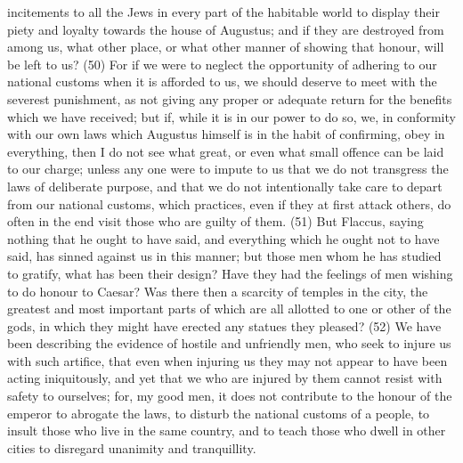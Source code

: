 incitements to all the Jews in every part of the habitable world to display their piety and loyalty
towards the house of Augustus; and if they are destroyed from among us, what other place, or
what other manner of showing that honour, will be left to us? (50) For if we were to neglect the
opportunity of adhering to our national customs when it is afforded to us, we should deserve to
meet with the severest punishment, as not giving any proper or adequate return for the benefits
which we have received; but if, while it is in our power to do so, we, in conformity with our own laws
which Augustus himself is in the habit of confirming, obey in everything, then I do not see what
great, or even what small offence can be laid to our charge; unless any one were to impute to us
that we do not transgress the laws of deliberate purpose, and that we do not intentionally take care
to depart from our national customs, which practices, even if they at first attack others, do often in
the end visit those who are guilty of them. (51) But Flaccus, saying nothing that he ought to have
said, and everything which he ought not to have said, has sinned against us in this manner; but
those men whom he has studied to gratify, what has been their design? Have they had the feelings
of men wishing to do honour to Caesar? Was there then a scarcity of temples in the city, the
greatest and most important parts of which are all allotted to one or other of the gods, in which they
might have erected any statues they pleased? (52) We have been describing the evidence of
hostile and unfriendly men, who seek to injure us with such artifice, that even when injuring us they
may not appear to have been acting iniquitously, and yet that we who are injured by them cannot
resist with safety to ourselves; for, my good men, it does not contribute to the honour of the
emperor to abrogate the laws, to disturb the national customs of a people, to insult those who live
in the same country, and to teach those who dwell in other cities to disregard unanimity and
tranquillity.

